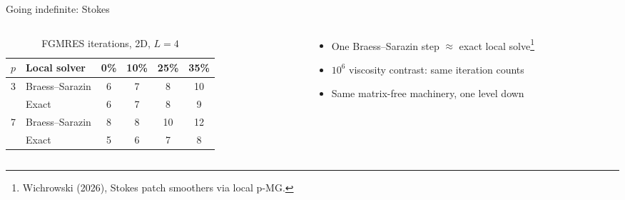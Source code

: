 \documentclass{beamer}
\begin{document}
\begin{frame}{Going indefinite: Stokes}
    \begin{columns}[T]
        \begin{column}{0.55\textwidth}

            \begin{table}
                \caption{FGMRES iterations, 2D, $L=4$}
                \centering
                \footnotesize
                \begin{tabular}{ll|cccc}
                    \toprule
                    $p$ & Local solver    & 0\% & 10\% & 25\% & 35\% \\
                    \midrule
                    3   & Braess--Sarazin & 6   & 7    & 8    & 10   \\
                        & Exact           & 6   & 7    & 8    & 9    \\
                    \midrule
                    7   & Braess--Sarazin & 8   & 8    & 10   & 12   \\
                        & Exact           & 5   & 6    & 7    & 8    \\
                    \bottomrule
                \end{tabular}
            \end{table}
        \end{column}
        \begin{column}{0.45\textwidth}
            \begin{itemize}
                \small
                \item \alert{One} Braess--Sarazin step $\approx$ exact local solve\footnote{Wichrowski (2026), Stokes patch smoothers
                          via local p-MG.}
                \item $10^6$ viscosity contrast: same iteration counts
                \item Same matrix-free machinery, one level down
            \end{itemize}
        \end{column}
    \end{columns}
\end{frame}

\end{document}
